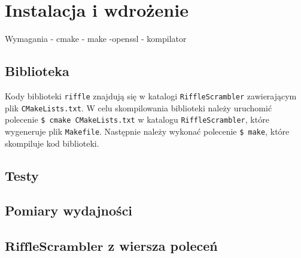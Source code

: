 \chapter{Instalacja i wdrożenie}
\thispagestyle{chapterBeginStyle}
\label{rozdzial4}


Wymagania - cmake - make -openssl - kompilator

\section{Biblioteka}
Kody biblioteki \texttt{riffle} znajdują się w katalogi \texttt{RiffleScrambler} zawierającym 
plik \texttt{CMakeLists.txt}.
W celu skompilowania biblioteki należy uruchomić polecenie \texttt{\$ cmake CMakeLists.txt} w katalogu \texttt{RiffleScrambler}, które wygeneruje plik \texttt{Makefile}. Następnie należy wykonać polecenie \texttt{\$ make}, które skompiluje kod biblioteki.


\section{Testy}


\section{Pomiary wydajności}


\section{$\mathbf{RiffleScrambler}$ z wiersza poleceń}
